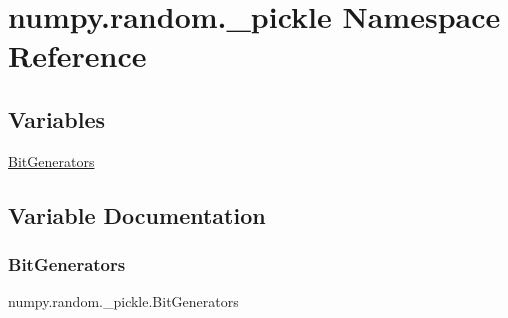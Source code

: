 \hypertarget{namespacenumpy_1_1random_1_1__pickle}{}\section{numpy.\+random.\+\_\+pickle Namespace Reference}
\label{namespacenumpy_1_1random_1_1__pickle}
\subsection*{Variables}
\begin{DoxyCompactItemize}
\item 
\hyperlink{namespacenumpy_1_1random_1_1__pickle_aaf888e2db89b74597c8dd9a0540558f4}{Bit\+Generators}
\end{DoxyCompactItemize}


\subsection{Variable Documentation}
\mbox{\label{namespacenumpy_1_1random_1_1__pickle_aaf888e2db89b74597c8dd9a0540558f4}} 
\subsubsection{\texorpdfstring{Bit\+Generators}{BitGenerators}}
{\footnotesize\ttfamily numpy.\+random.\+\_\+pickle.\+Bit\+Generators}

